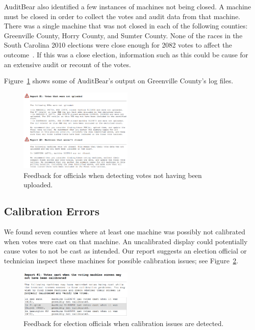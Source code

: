 \documentclass[letterpaper,twocolumn,10pt]{article}
\begin{document}
AuditBear also identified a few instances of machines not being closed. A
machine must be closed in order to collect the votes and audit data from that
machine. There was a single machine that was not closed in each of the following
counties: Greenville County, Horry County, and Sumter County. None of the races in 
the South Carolina 2010 elections were close enough for 2082 votes to affect the 
outcome~\cite{http://www.enr-scvotes.org/SC/19077/40477/en/summary.html}. If this 
was a close election, information such as this could be cause for an extensive audit 
or recount of the votes.  

Figure~\ref{fig:greenville-logs} shows some of AuditBear’s output on Greenville
County’s log files. 

\begin{figure}[htbp]
\begin{center}
    \includegraphics[width=0.5\textwidth,height=0.3\textheight]{VotesNotUploaded.eps}
\end{center}
\caption{Feedback for officials when detecting votes not having been uploaded.}
\label{fig:greenville-logs}
\end{figure}

\subsection{Calibration Errors}
 We found seven counties where at least one machine was possibly not calibrated
when votes were cast on that machine. An uncalibrated display could potentially
cause votes to not be cast as intended. Our report suggests an election official
or technician inspect these machines for possible calibration issues; see
Figure~\ref{fig:calibration-issues}.


\begin{figure}[htbp]
\begin{center}
    \includegraphics[width=0.5\textwidth,height=0.2\textheight]{NotCalibrated.eps}
\end{center}
\caption{Feedback for election officials when calibration issues are detected.}
\label{fig:calibration-issues}
\end{figure}
\end{document}
